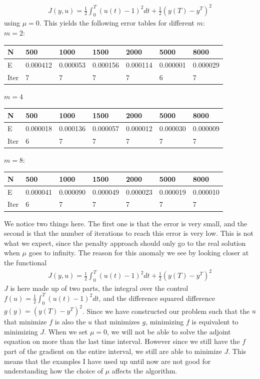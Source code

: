 \documentclass[11pt,a4paper]{report}
\begin{document}
\begin{align*}
J(y,u) = \frac{1}{2}\int_0^T(u(t)-1)^2dt + \frac{1}{2}(y(T)-y^T)^2
\end{align*}
using $\mu=0$. This yields the following error tables for different $m$:
\\
$m=2$:
\begin{center}
    \begin{tabular}{| l | l | l | l | l | l | l |}
    \hline
    N & 500 & 1000  & 1500 & 2000 & 5000 & 8000 \\ \hline
    E & 0.000412 & 0.000053 &0.000156 & 0.000114 & 0.000001 & 0.000029	\\ \hline
    Iter & 7 & 7  & 7 & 7 & 6 & 7 \\ \hline
    \end{tabular}
\end{center}
$m=4$
\begin{center}
    \begin{tabular}{| l | l | l | l | l | l | l |}
    \hline
    N & 500 & 1000  & 1500 & 2000 & 5000 & 8000 \\ \hline
    E & 0.000018 & 0.000136& 0.000057& 0.000012 & 0.000030& 0.000009\\ \hline
    Iter & 6 & 7  & 7 & 7 & 7 & 7 \\ \hline
    \end{tabular}
\end{center}
$m=8$:
\begin{center}
    \begin{tabular}{| l | l | l | l | l | l | l |}
    \hline
    N & 500 & 1000  & 1500 & 2000 & 5000 & 8000 \\ \hline
    E & 0.000041 & 0.000090 &0.000049 & 0.000023 & 0.000019 & 0.000010	\\ \hline
    Iter & 6 & 7& 7 & 7 & 7 & 7 \\ \hline
    \end{tabular}
\end{center}
We notice two things here. The first one is that the error is very small, and the second is that the number of iterations to reach this error is very low. This is not what we expect, since the penalty approach should only go to the real solution when $\mu$ goes to infinity. The reason for this anomaly we see by looking closer at the functional 
\begin{align*}
J(y,u) = \frac{1}{2}\int_0^T(u(t)-1)^2dt + \frac{1}{2}(y(T)-y^T)^2
\end{align*}
$J$ is here made up of two parts, the integral over the control \\$f(u)=\frac{1}{2}\int_0^T(u(t)-1)^2dt $, and the difference squared difference \\$g(y)= (y(T)-y^T)^2$. Since we have constructed our problem such that the $u$ that minimize $f$ is also the $u$ that minimizes $g$, minimizing $f$ is equivalent to minimizing $J$. When we set $\mu=0$, we will not be able to solve the adjoint equation on more than the last time interval. However since we still have the $f$ part of the gradient on the entire interval, we still are able to minimize $J$. This means that the examples I have used up until now are not good for understanding how the choice of $\mu$ affects the algorithm. 
\end{document}

